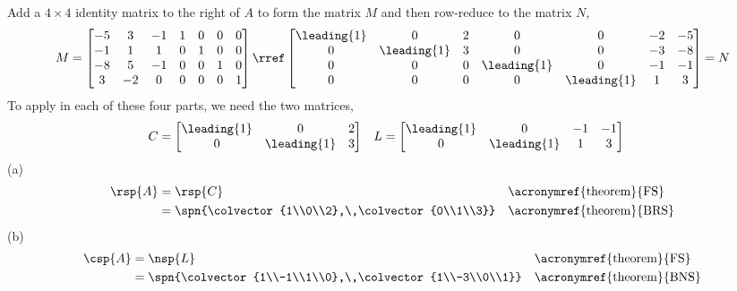 Add a $4\times 4$ identity matrix to the right of $A$ to form the matrix $M$ and then row-reduce to the matrix $N$,
%
\begin{equation*}
M=
\begin{bmatrix}
 -5 & 3 & -1 & 1 & 0 & 0 & 0 \\
 -1 & 1 & 1 & 0 & 1 & 0 & 0 \\
 -8 & 5 & -1 & 0 & 0 & 1 & 0 \\
 3 & -2 & 0 & 0 & 0 & 0 & 1
\end{bmatrix}
%
\rref
%
\begin{bmatrix}
 \leading{1} & 0 & 2 & 0 & 0 & -2 & -5 \\
 0 & \leading{1} & 3 & 0 & 0 & -3 & -8 \\
 0 & 0 & 0 & \leading{1} & 0 & -1 & -1 \\
 0 & 0 & 0 & 0 & \leading{1} & 1 & 3
\end{bmatrix}
=N
\end{equation*}
%
To apply  in each of these four parts, we need the two matrices,
%
\begin{align*}
C&=
\begin{bmatrix}
 \leading{1} & 0 & 2 \\
 0 & \leading{1} & 3 
\end{bmatrix}
&
L&=
\begin{bmatrix}
\leading{1} & 0 & -1 & -1 \\
0 & \leading{1} & 1 & 3
\end{bmatrix}
\end{align*}
%
(a)
%
\begin{align*}
\rsp{A}
&=\rsp{C}&&\text{\acronymref{theorem}{FS}}\\
&=\spn{\colvector{1\\0\\2},\,\colvector{0\\1\\3}}&&\text{\acronymref{theorem}{BRS}}
\end{align*}
%
(b)
%
\begin{align*}
\csp{A}
&=\nsp{L}&&\text{\acronymref{theorem}{FS}}\\
&=\spn{\colvector{1\\-1\\1\\0},\,\colvector{1\\-3\\0\\1}}&&\text{\acronymref{theorem}{BNS}}
\end{align*}
